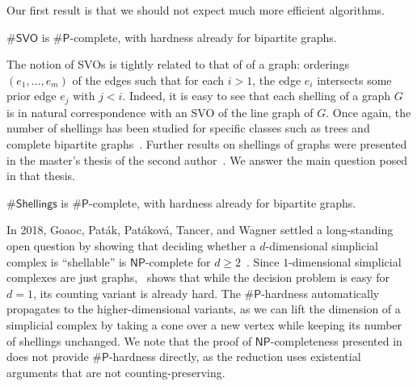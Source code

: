 \documentclass[11pt]{amsart}
\begin{document}
Our first result is that we should not expect much more efficient algorithms.

\begin{thm}\label{thm:main}
    $\#\mathsf{SVO}$ is $\#\mathsf{P}$-complete, with hardness already for bipartite graphs.
\end{thm}

The notion of SVOs is tightly related to that of  of a graph: orderings $(e_1, \dots, e_m)$ of the edges such that for each $i > 1$, the edge $e_i$ intersects some prior edge $e_j$ with $j < i$.
Indeed, it is easy to see that each shelling of a graph $G$ is in natural correspondence with an SVO of the line graph of $G$. Once again, the number of shellings has been studied for specific classes such as trees and complete bipartite graphs~\cite{gaoCountingShellingsComplete2021}. Further results on shellings of graphs were presented in the master's thesis of the second author~\cite{masterAle}. We answer the main question posed in that thesis.

\begin{thm}\label{thm:shellings}
$\#\mathsf{Shellings}$ is $\#\mathsf{P}$-complete, with hardness already for bipartite graphs.
\end{thm}

In 2018, Goaoc, Pat\'ak, Pat\'akov\'a, Tancer, and Wagner settled a long-standing open question by showing that deciding whether a $d$-dimensional simplicial complex is ``shellable'' is $\mathsf{NP}$-complete for $d \geq 2$~\cite{Shellability}. Since $1$-dimensional simplicial complexes are just graphs,~ shows that while the decision problem is easy for $d=1$, its counting variant is already hard. The $\#\mathsf{P}$-hardness automatically propagates to the higher-dimensional variants, as we can lift the dimension of a simplicial complex by taking a cone over a new vertex while keeping its number of shellings unchanged. We note that the proof of $\mathsf{NP}$-completeness presented in~\cite{Shellability} does not provide $\#\mathsf{P}$-hardness directly, as the reduction uses existential arguments that are not counting-preserving. 


\end{document}
